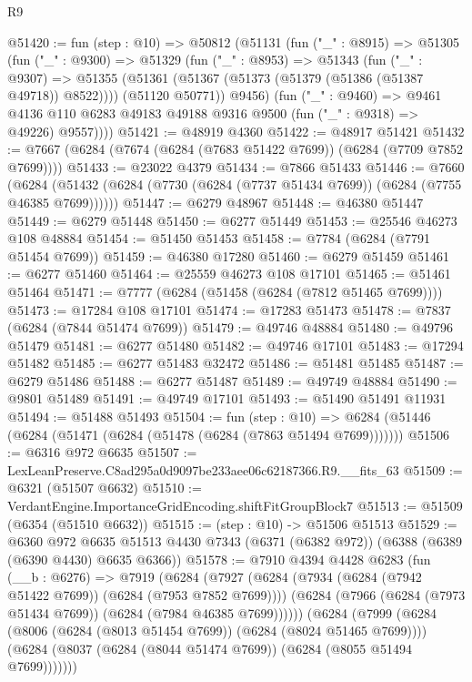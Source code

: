 \begin{lexlean}{R9}
\begin{coremodule}
@51420 := fun (step : @10) =>
  @50812
    (@51131
      (fun ("_" : @8915) =>
      @51305
        (fun ("_" : @9300) =>
        @51329
          (fun ("_" : @8953) =>
          @51343
            (fun ("_" : @9307) =>
            @51355
              (@51361 (@51367 (@51373 (@51379 (@51386 (@51387 @49718)) @8522))))
              (@51120 @50771))
            @9456)
          (fun ("_" : @9460) =>
          @9461 @4136 @110 @6283 @49183 @49188 @9316 @9500 (fun ("_" : @9318) => @49226) @9557))))
@51421 := @48919 @4360
@51422 := @48917 @51421
@51432 := @7667 (@6284 (@7674 (@6284 (@7683 @51422 @7699)) (@6284 (@7709 @7852 @7699))))
@51433 := @23022 @4379
@51434 := @7866 @51433
@51446 := @7660
    (@6284 (@51432 (@6284 (@7730 (@6284 (@7737 @51434 @7699)) (@6284 (@7755 @46385 @7699))))))
@51447 := @6279 @48967
@51448 := @46380 @51447
@51449 := @6279 @51448
@51450 := @6277 @51449
@51453 := @25546 @46273 @108 @48884
@51454 := @51450 @51453
@51458 := @7784 (@6284 (@7791 @51454 @7699))
@51459 := @46380 @17280
@51460 := @6279 @51459
@51461 := @6277 @51460
@51464 := @25559 @46273 @108 @17101
@51465 := @51461 @51464
@51471 := @7777 (@6284 (@51458 (@6284 (@7812 @51465 @7699))))
@51473 := @17284 @108 @17101
@51474 := @17283 @51473
@51478 := @7837 (@6284 (@7844 @51474 @7699))
@51479 := @49746 @48884
@51480 := @49796 @51479
@51481 := @6277 @51480
@51482 := @49746 @17101
@51483 := @17294 @51482
@51485 := @6277 @51483 @32472
@51486 := @51481 @51485
@51487 := @6279 @51486
@51488 := @6277 @51487
@51489 := @49749 @48884
@51490 := @9801 @51489
@51491 := @49749 @17101
@51493 := @51490 @51491 @11931
@51494 := @51488 @51493
@51504 := fun (step : @10) =>
  @6284 (@51446 (@6284 (@51471 (@6284 (@51478 (@6284 (@7863 @51494 @7699)))))))
@51506 := @6316 @972 @6635
@51507 := LexLeanPreserve.C8ad295a0d9097be233aee06c62187366.R9.__fits_63
@51509 := @6321 (@51507 @6632)
@51510 := VerdantEngine.ImportanceGridEncoding.shiftFitGroupBlock7
@51513 := @51509 (@6354 (@51510 @6632))
@51515 := (step : @10) -> @51506 @51513
@51529 := @6360
    @972
    @6635
    @51513
    @4430
    @7343
    (@6371 (@6382 @972))
    (@6388 (@6389 (@6390 @4430) @6635 @6366))
@51578 := @7910
    @4394
    @4428
    @6283
    (fun (__b : @6276) =>
    @7919
      (@6284
        (@7927
          (@6284 (@7934 (@6284 (@7942 @51422 @7699)) (@6284 (@7953 @7852 @7699))))
          (@6284 (@7966 (@6284 (@7973 @51434 @7699)) (@6284 (@7984 @46385 @7699))))))
      (@6284
        (@7999
          (@6284 (@8006 (@6284 (@8013 @51454 @7699)) (@6284 (@8024 @51465 @7699))))
          (@6284 (@8037 (@6284 (@8044 @51474 @7699)) (@6284 (@8055 @51494 @7699)))))))

\end{coremodule}
\end{lexlean}
